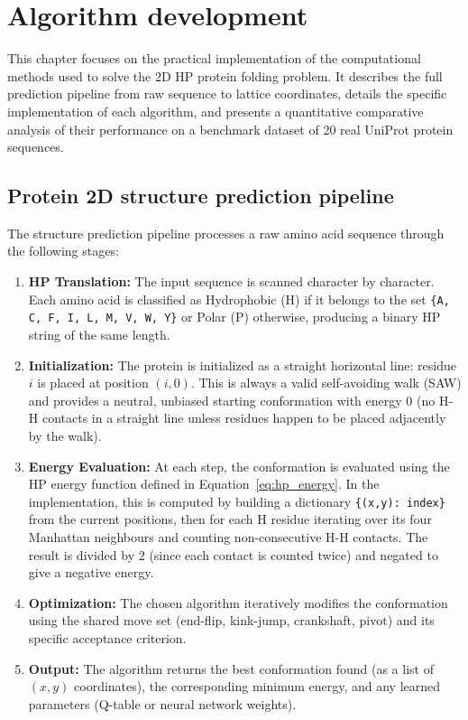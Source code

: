 \chapter{Algorithm development}
\label{cap4}

This chapter focuses on the practical implementation of the computational methods used to solve the 2D HP protein folding problem. It describes the full prediction pipeline from raw sequence to lattice coordinates, details the specific implementation of each algorithm, and presents a quantitative comparative analysis of their performance on a benchmark dataset of 20 real UniProt protein sequences.

\section{Protein 2D structure prediction pipeline}
\label{cap4:sec_pipeline}

The structure prediction pipeline processes a raw amino acid sequence through the following stages:

\begin{enumerate}
    \item \textbf{HP Translation:} The input sequence is scanned character by character. Each amino acid is classified as Hydrophobic (H) if it belongs to the set \texttt{\{A, C, F, I, L, M, V, W, Y\}} or Polar (P) otherwise, producing a binary HP string of the same length.

    \item \textbf{Initialization:} The protein is initialized as a straight horizontal line: residue $i$ is placed at position $(i, 0)$. This is always a valid self-avoiding walk (SAW) and provides a neutral, unbiased starting conformation with energy 0 (no H-H contacts in a straight line unless residues happen to be placed adjacently by the walk).

    \item \textbf{Energy Evaluation:} At each step, the conformation is evaluated using the HP energy function defined in Equation~\ref{eq:hp_energy}. In the implementation, this is computed by building a dictionary \texttt{\{(x,y): index\}} from the current positions, then for each H residue iterating over its four Manhattan neighbours and counting non-consecutive H-H contacts. The result is divided by 2 (since each contact is counted twice) and negated to give a negative energy.

    \item \textbf{Optimization:} The chosen algorithm iteratively modifies the conformation using the shared move set (end-flip, kink-jump, crankshaft, pivot) and its specific acceptance criterion.

    \item \textbf{Output:} The algorithm returns the best conformation found (as a list of $(x, y)$ coordinates), the corresponding minimum energy, and any learned parameters (Q-table or neural network weights).
\end{enumerate}

